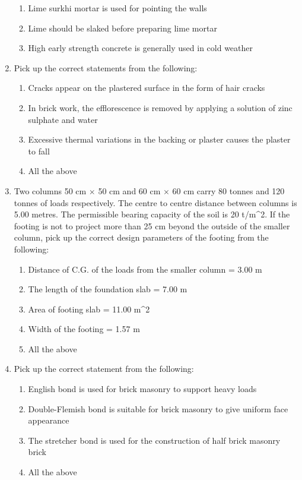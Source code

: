 \documentclass[11pt,a4paper]{article}
\begin{document}
\begin{enumerate}
\begin{enumerate}[label=\Alph*.]
\item{Lime surkhi mortar is used for pointing the walls}
\item{Lime should be slaked before preparing lime mortar}
\item{High early strength concrete is generally used in cold weather}
\end{enumerate}
\item{Pick up the correct statements from the following:}
\begin{enumerate}[label=\Alph*.]
\item{Cracks appear on the plastered surface in the form of hair cracks}
\item{In brick work, the efflorescence is removed by applying a solution of zinc sulphate and water}
\item{Excessive thermal variations in the backing or plaster causes the plaster to fall}
\item{All the above}
\end{enumerate}
\item{Two columns 50 cm $\times$ 50 cm and 60 cm $\times$ 60 cm carry 80 tonnes and 120 tonnes of loads respectively. The centre to centre distance between columns is 5.00 metres. The permissible bearing capacity of the soil is 20 t/m\^{}2. If the footing is not to project more than 25 cm beyond the outside of the smaller column, pick up the correct design parameters of the footing from the following:
}
\begin{enumerate}[label=\Alph*.]
\item{Distance of C.G. of the loads from the smaller column = 3.00 m}
\item{The length of the foundation slab = 7.00 m}
\item{Area of footing slab = 11.00 m\^{}2}
\item{Width of the footing = 1.57 m}
\item{All the above}
\end{enumerate}
\item{Pick up the correct statement from the following:}
\begin{enumerate}[label=\Alph*.]
\item{English bond is used for brick masonry to support heavy loads}
\item{Double-Flemish bond is suitable for brick masonry to give uniform face appearance}
\item{The stretcher bond is used for the construction of half brick masonry brick}
\item{All the above}

\end{enumerate}
\end{enumerate}
\end{document}
